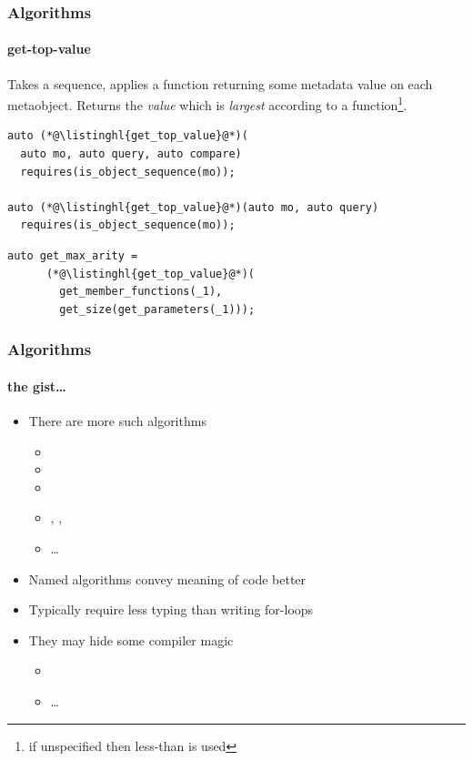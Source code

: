 \documentclass[compress,table,xcolor=table]{beamer}
\begin{document}
\begin{frame}[fragile]
  \frametitle{Algorithms}
  \framesubtitle{get-top-value}
  Takes a sequence, applies a  function returning some metadata
  value on each metaobject.
  Returns the {\em value} which is {\em largest} according
  to a  function\footnote{if unspecified then less-than is used}.
  \begin{lstlisting}[language=c++2x]
auto (*@\listinghl{get_top_value}@*)(
  auto mo, auto query, auto compare)
  requires(is_object_sequence(mo));

auto (*@\listinghl{get_top_value}@*)(auto mo, auto query)
  requires(is_object_sequence(mo));
  \end{lstlisting}
  \vfill
  \begin{lstlisting}[language=c++2x,basicstyle=\footnotesize\ttfamily]
    auto get_max_arity =
      (*@\listinghl{get_top_value}@*)(
        get_member_functions(_1),
        get_size(get_parameters(_1)));
  \end{lstlisting}
\end{frame}
\begin{frame}
  \frametitle{Algorithms}
  \framesubtitle{the gist\ldots}
  \larger
  \begin{itemize}
    \item There are more such algorithms
    \begin{itemize}
      \item {}
      \item {}
      \item {}
      \item {}, , 
      \item \ldots
    \end{itemize}
    \item Named algorithms convey meaning of code better
    \item Typically require less typing than writing for-loops
    \item They may hide some compiler magic
    \begin{itemize}
      \item {}
      \item \ldots
    \end{itemize}
  \end{itemize}
\end{frame}
\end{document}
